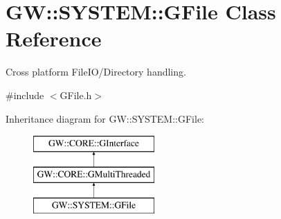 \hypertarget{class_g_w_1_1_s_y_s_t_e_m_1_1_g_file}{}\section{GW\+:\+:S\+Y\+S\+T\+EM\+:\+:G\+File Class Reference}
\label{class_g_w_1_1_s_y_s_t_e_m_1_1_g_file}


Cross platform File\+I\+O/\+Directory handling.  




{\ttfamily \#include $<$G\+File.\+h$>$}

Inheritance diagram for GW\+:\+:S\+Y\+S\+T\+EM\+:\+:G\+File\+:\begin{figure}[H]
\begin{center}
\leavevmode
\includegraphics[height=3.000000cm]{class_g_w_1_1_s_y_s_t_e_m_1_1_g_file}
\end{center}
\end{figure}
